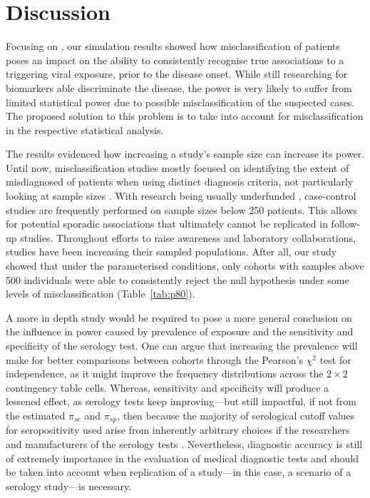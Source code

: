 \section{Discussion}

Focusing on \cfs, our simulation results showed how misclassification of patients poses an impact on the ability to consistently recognise true associations to a triggering viral exposure, prior to the disease onset. While still researching for biomarkers able discriminate the disease, the power is very likely to suffer from limited statistical power due to possible misclassification of the suspected \cfs cases. The proposed solution to this problem is to take into account for misclassification in the respective statistical analysis.

The results evidenced how increasing a study's sample size can increase its power. Until now, misclassification studies mostly focused on identifying the extent of misdiagnosed of patients when using distinct diagnosis criteria, not particularly looking at sample sizes \citep{malato2021Statisticalchallenges}. With \cfs research being usually underfunded \citep{dimmockEstimatingDiseaseBurden2016, mirinResearchUpdateRelation2020}, case-control studies are frequently performed on sample sizes below 250 patients. This allows for potential sporadic associations that ultimately cannot be replicated in follow-up studies. Throughout efforts to raise awareness and laboratory collaborations, studies have been increasing their sampled populations. After all, our study showed that under the parameterised conditions, only cohorts with samples above 500 individuals were able to consistently reject the null hypothesis under some levels of misclassification (Table~\ref{tab:p80}).

A more in depth study would be required to pose a more general conclusion on the influence in power caused by prevalence of exposure and the sensitivity and specificity of the serology test. One can argue that increasing the prevalence will make for better comparisons between cohorts through the Pearson's $\chi^2$ test for independence, as it might improve the frequency distributions across the $2 \times 2$ contingency table cells. Whereas, sensitivity and specificity will produce a lessened effect, as serology tests keep improving---but still impactful, if not from the estimated $\pi_{se}$ and $\pi_{sp}$, then because the majority of serological cutoff values for seropositivity used arise from inherently arbitrary choices if the researchers and manufacturers of the serology tests \citep{domingues2021HerpesvirusesSerologya, domingues2021AnalysisAntibody}. Nevertheless, diagnostic accuracy is still of extremely importance in the evaluation of medical diagnostic tests and should be taken into account when replication of a study---in this case, a scenario of a serology study---is necessary.

